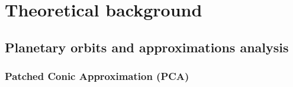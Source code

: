 \chapter{Theoretical background}



\section{Planetary orbits and approximations analysis}

\subsection{Patched Conic Approximation (PCA)}


 